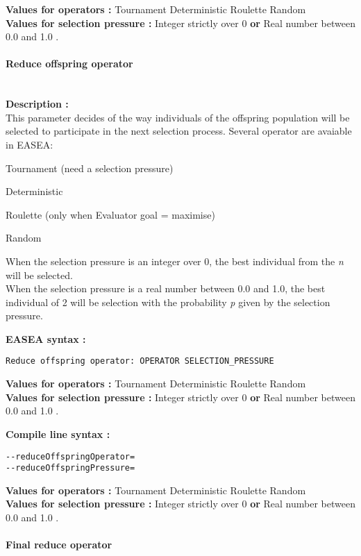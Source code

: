 \documentclass{book}
\begin{document}
\textbf{Values for operators :} Tournament Deterministic Roulette
Random\\\textbf{Values for selection pressure :} Integer strictly over 0
\textbf{or} Real number between 0.0 and 1.0 .

\paragraph{Reduce offspring
operator}\label{reduce-offspring-operator}
~\\

\textbf{Description :}\\This parameter decides of the way individuals of
the offspring population will be selected to participate in the next
selection process. Several operator are avaiable in EASEA:

Tournament (need a selection pressure)

Deterministic

Roulette (only when Evaluator goal = maximise)

Random

When the selection pressure is an integer over 0, the best individual
from the \emph{n} will be selected.\\When the selection pressure is a
real number between 0.0 and 1.0, the best individual of 2 will be
selection with the probability \emph{p} given by the selection pressure.

\textbf{EASEA syntax :}

\texttt{Reduce~offspring~operator:~OPERATOR~SELECTION\_PRESSURE}

\textbf{Values for operators :} Tournament Deterministic Roulette
Random\\\textbf{Values for selection pressure :} Integer strictly over 0
\textbf{or} Real number between 0.0 and 1.0 .

\textbf{Compile line syntax :}

\texttt{-{}-reduceOffspringOperator=}\\\texttt{-{}-reduceOffspringPressure=}

\textbf{Values for operators :} Tournament Deterministic Roulette
Random\\\textbf{Values for selection pressure :} Integer strictly over 0
\textbf{or} Real number between 0.0 and 1.0 .

\paragraph{Final reduce operator}\label{final-reduce-operator}
~\\
\end{document}
